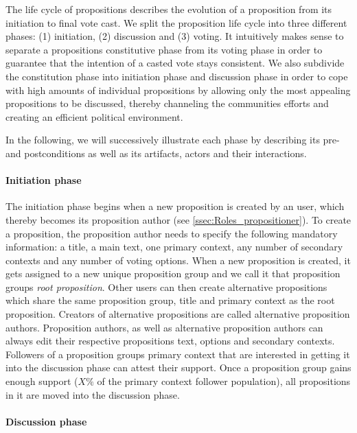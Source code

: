 The life cycle of propositions describes the evolution of a proposition from its initiation to final vote cast.
We split the proposition life cycle into three different phases: (1) initiation, (2) discussion and (3) voting.
It intuitively makes sense to separate a propositions constitutive phase from its voting phase in order to guarantee that the intention of a casted vote stays consistent.
We also subdivide the constitution phase into initiation phase and discussion phase in order to cope with high amounts of individual propositions by allowing only the most appealing propositions to be discussed, thereby channeling the communities efforts and creating an efficient political environment.

In the following, we will successively illustrate each phase by describing its pre- and postconditions as well as its artifacts, actors and their interactions.

\paragraph{Initiation phase}
\label{ssec:Lifecycle_Initiation}

The initiation phase begins when a new proposition is created by an user, which thereby becomes its proposition author (see \ref{ssec:Roles_propositioner}).
To create a proposition, the proposition author needs to specify the following mandatory information: a title, a main text, one primary context, any number of secondary contexts and any number of voting options.
When a new proposition is created, it gets assigned to a new unique proposition group and we call it that proposition groups \emph{root proposition}.
Other users can then create alternative propositions which share the same proposition group, title and primary context as the root proposition.
Creators of alternative propositions are called alternative proposition authors.
Proposition authors, as well as alternative proposition authors can always edit their respective propositions text, options and secondary contexts.
Followers of a proposition groups primary context that are interested in getting it into the discussion phase can attest their support.
Once a proposition group gains enough support ($X\%$ of the primary context follower population), all propositions in it are moved into the discussion phase.


\paragraph{Discussion phase}
\label{ssec:Lifecycle_Discussion}

